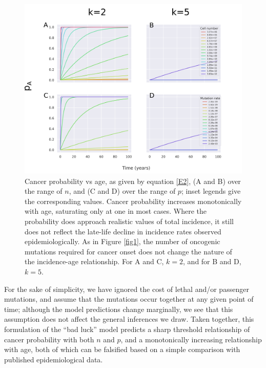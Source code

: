 \documentclass[9pt,twocolumn,twoside]{pnas-new}
\begin{document}
\begin{figure}[tbhp]
	\centering
	\includegraphics[width=.8\linewidth]{fig2.png}
	\caption{Cancer probability vs age, as given by equation \ref{E2}, (A and B) over the range of $n$, and (C and D) over the range of $p$; inset legends give the corresponding values. Cancer probability increases monotonically with age, saturating only at one in most cases. Where the probability does approach realistic values of total incidence, it still does not reflect the late-life decline in incidence rates observed epidemiologically. As in Figure \ref{fig1}, the number of oncogenic mutations required for cancer onset does not change the nature of the incidence-age relationship. For A and C, $k=2$, and for B and D, $k=5$.}
	\label{fig2}
\end{figure}

For the sake of simplicity, we have ignored the cost of lethal and/or passenger mutations, and assume that the mutations occur together at any given point of time; although the model predictions change marginally, we see that this assumption does not affect the general inferences we draw. Taken together, this formulation of the ``bad luck'' model predicts a sharp threshold relationship of cancer probability with both $n$ and $p$, and a monotonically increasing relationship with age, both of which can be falsified based on a simple comparison with published epidemiological data.
\end{document}
